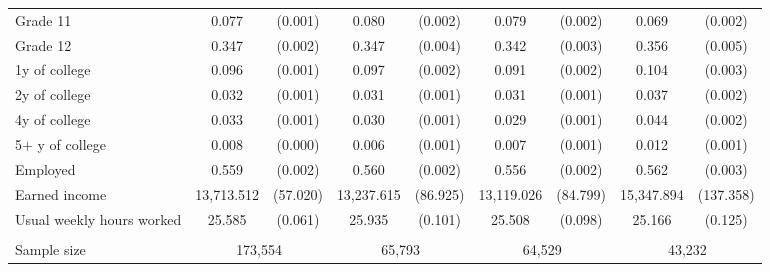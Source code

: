 \begin{tabular}{lcccccccc}
 \hspace{0.3cm} Grade 11   & 0.077 & (0.001)  & 0.080 & (0.002)  & 0.079 & (0.002)  & 0.069 & (0.002)  \\
 \hspace{0.3cm} Grade 12   & 0.347 & (0.002)  & 0.347 & (0.004)  & 0.342 & (0.003)  & 0.356 & (0.005)  \\
 \hspace{0.3cm} 1y of college   & 0.096 & (0.001)  & 0.097 & (0.002)  & 0.091 & (0.002)  & 0.104 & (0.003)  \\
 \hspace{0.3cm} 2y of college   & 0.032 & (0.001)  & 0.031 & (0.001)  & 0.031 & (0.001)  & 0.037 & (0.002)  \\
 \hspace{0.3cm} 4y of college   & 0.033 & (0.001)  & 0.030 & (0.001)  & 0.029 & (0.001)  & 0.044 & (0.002)  \\
 \hspace{0.3cm} 5$+$ y of college   & 0.008 & (0.000)  & 0.006 & (0.001)  & 0.007 & (0.001)  & 0.012 & (0.001)  \\
 Employed   & 0.559 & (0.002)  & 0.560 & (0.002)  & 0.556 & (0.002)  & 0.562 & (0.003)  \\
 Earned income   & 13,713.512 & (57.020)  & 13,237.615 & (86.925)  & 13,119.026 & (84.799)  & 15,347.894 & (137.358)  \\
 Usual weekly hours worked   & 25.585 & (0.061)  & 25.935 & (0.101)  & 25.508 & (0.098)  & 25.166 & (0.125)  \\
\\
Sample size & \multicolumn{2}{c}{173,554}  & \multicolumn{2}{c}{65,793}  & \multicolumn{2}{c}{64,529}  & \multicolumn{2}{c}{43,232}  \\
\bottomrule
\bottomrule
\end{tabular}